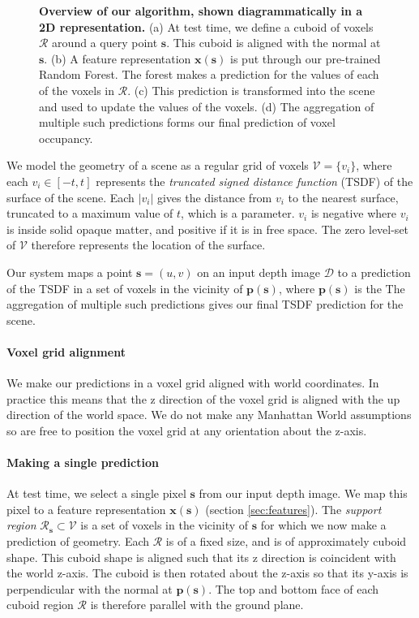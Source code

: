 \documentclass[10pt,twocolumn,letterpaper]{article}
\newcommand{\rgbdimage}{\mathcal{D}}
\newcommand{\pixelidx}{\mathbf{s}}
\newcommand{\voxelgrid}{\mathcal{V}}
\newcommand{\voxel}{v}
\newcommand{\voxidx}{i}
\newcommand{\project}{\mathbf{p}}
\begin{document}
\begin{figure}[tb]
    \caption{\textbf{Overview of our algorithm, shown diagrammatically in a 2D representation.} 
    (a) At test time, we define a cuboid of voxels $\mathcal{R}$ around a query point $\pixelidx$.
    This cuboid is aligned with the normal at $\pixelidx$.
    (b) A feature representation $\mathbf{x}(\mathbf{s})$ is put through our pre-trained Random Forest.
    The forest makes a prediction for the values of each of the voxels in $\mathcal{R}$.
    (c) This prediction is transformed into the scene and used to update the values of the voxels.
    (d) The aggregation of multiple such predictions forms our final prediction of voxel occupancy.
    }%
    \label{fig:overview}
\end{figure}


We model the geometry of a scene as a regular grid of voxels $\voxelgrid = \{\voxel_\voxidx\}$, where each $\voxel_\voxidx \in [-t, t]$ represents the \emph{truncated signed distance function} (TSDF) of the surface of the scene. 
Each $|\voxel_\voxidx|$ gives the distance from $\voxel_\voxidx$ to the nearest surface, truncated to a maximum value of $t$, which is a parameter. 
$\voxel_\voxidx$ is negative where $\voxel_\voxidx$ is inside solid opaque matter, and positive if it is in free space. 
The zero level-set of $\voxelgrid$ therefore represents the location of the surface.

\newcommand{\voxregion}{\mathcal{R}}

Our system maps a point $\pixelidx = (u, v)$ on an input depth image $\rgbdimage$ to a prediction of the TSDF in a set of voxels in the vicinity of $\project(\pixelidx)$, where $\project(\pixelidx)$ is the 
The aggregation of multiple such predictions gives our final TSDF prediction for the scene.


\paragraph{Voxel grid alignment}
We make our predictions in a voxel grid aligned with world coordinates.
In practice this means that the z direction of the voxel grid is aligned with the up direction of the world space.
We do not make any Manhattan World assumptions so are free to position the voxel grid at any orientation about the z-axis.

\paragraph{Making a single prediction}
At test time, we select a single pixel $\pixelidx$ from our input depth image.
We map this pixel to a feature representation $\mathbf{x}(\pixelidx)$ (section \ref{sec:features}).
The \emph{support region} $\voxregion_\pixelidx \subset \voxelgrid$ is a set of voxels in the vicinity of $\pixelidx$ for which we now make a prediction of geometry.
Each $\voxregion$ is of a fixed size, and is of approximately cuboid shape.
This cuboid shape is aligned such that its z direction is coincident with the world z-axis. 
The cuboid is then rotated about the z-axis so that its y-axis is perpendicular with the normal at $\project(\pixelidx)$.
The top and bottom face of each cuboid region $\voxregion$ is therefore parallel with the ground plane.
\end{document}
